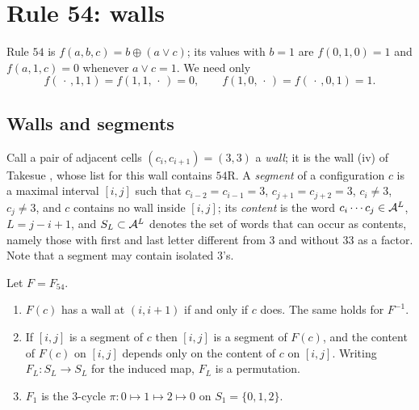 \section{Rule 54: walls}\label{sec:54}

Rule $54$ is $f(a,b,c)=b\oplus(a\vee c)$; its values with $b=1$ are $f(0,1,0)=1$ and $f(a,1,c)=0$ whenever $a\vee c=1$. We need only
\begin{equation}\label{eq:wall}
f(\,\cdot\,,1,1)=f(1,1,\,\cdot\,)=0,\qquad f(1,0,\,\cdot\,)=f(\,\cdot\,,0,1)=1 .
\end{equation}

\subsection{Walls and segments}
Call a pair of adjacent cells $(c_i,c_{i+1})=(3,3)$ a \emph{wall}; it is the wall (iv) of Takesue \cite[Fig.~2, Table~III]{Takesue1989}, whose list for this wall contains $54$R. A \emph{segment} of a configuration $c$ is a maximal interval $[i,j]$ such that $c_{i-2}=c_{i-1}=3$, $c_{j+1}=c_{j+2}=3$, $c_i\ne3$, $c_j\ne3$, and $c$ contains no wall inside $[i,j]$; its \emph{content} is the word $c_i\cdots c_j\in\mathcal{A}^{L}$, $L=j-i+1$, and $S_L\subset\mathcal{A}^L$ denotes the set of words that can occur as contents, namely those with first and last letter different from $3$ and without $33$ as a factor. Note that a segment may contain isolated $3$'s.

\begin{lemma}\label{lem:walls}
Let $F=F_{54}$.
\begin{enumerate}
\item[(i)] $F(c)$ has a wall at $(i,i+1)$ if and only if $c$ does. The same holds for $F^{-1}$.
\item[(ii)] If $[i,j]$ is a segment of $c$ then $[i,j]$ is a segment of $F(c)$, and the content of $F(c)$ on $[i,j]$ depends only on the content of $c$ on $[i,j]$. Writing $F_L\colon S_L\to S_L$ for the induced map, $F_L$ is a permutation.
\item[(iii)] $F_1$ is the $3$-cycle $\pi\colon0\mapsto1\mapsto2\mapsto0$ on $S_1=\{0,1,2\}$.
\end{enumerate}
\end{lemma}

